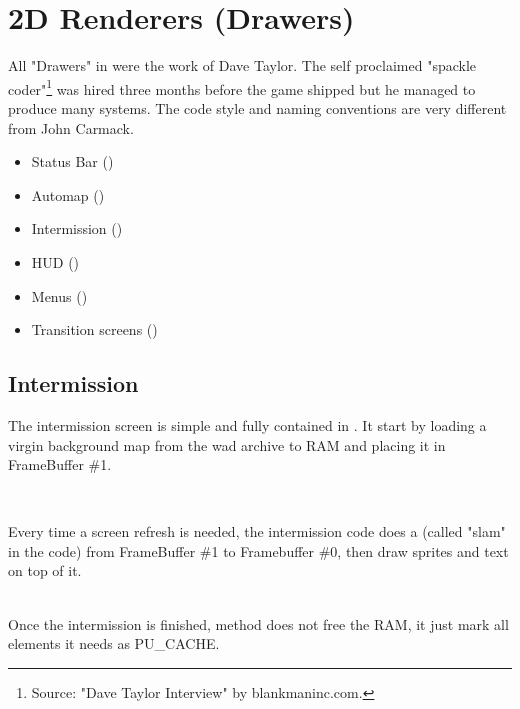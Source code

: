 
\section{2D Renderers (Drawers)}
All "Drawers" in \doom{} were the work of  Dave Taylor. The self proclaimed "spackle coder"\footnote{Source: "Dave Taylor Interview" by blankmaninc.com.} was hired three months before the game shipped but he managed to produce many systems. The code style and naming conventions are very different from John Carmack.
\begin{itemize}
\item Status Bar ()
\item Automap ()
\item Intermission ()
\item HUD ()
\item Menus ()
\item Transition screens ()
\end{itemize} 
\par




\subsection{Intermission}
The intermission screen is simple and fully contained in . It start by loading a virgin background map from the wad archive to RAM and placing it in FrameBuffer \#1.\\
\par
{}\\
\par
Every time a screen refresh is needed, the intermission code does a  (called "slam" in the code) from FrameBuffer \#1 to Framebuffer \#0, then draw sprites and text on top of it.\\
\par
{}\\

Once the intermission is finished, method  does not free the RAM, it just mark all elements it needs as PU\_CACHE.\\




\par

